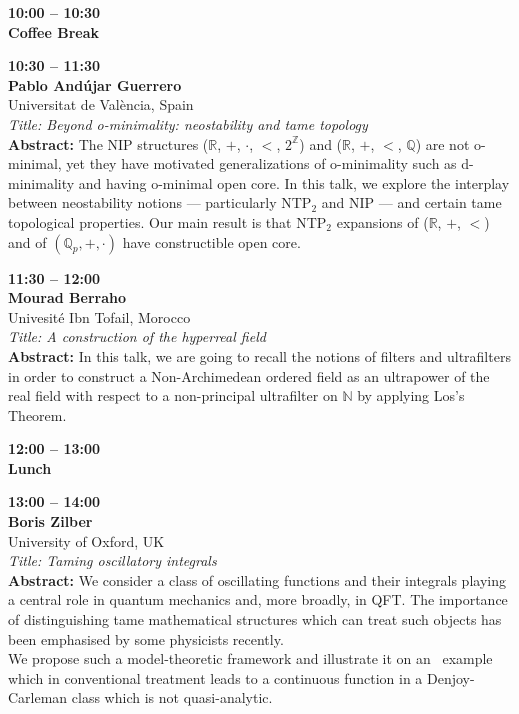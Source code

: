 \documentclass[10pt,a4paper]{article}
\begin{document}
\begin{tcolorbox}[talkbox]
\textbf{10:00 -- 10:30} \\
\textbf{Coffee Break}
\end{tcolorbox}

\begin{tcolorbox}[talkbox]
\textbf{10:30 -- 11:30} \\
\textbf{Pablo Andújar Guerrero} \\
Universitat de València, Spain \\
\textit{Title: Beyond o-minimality: neostability and tame topology} \\
\textbf{Abstract:} The NIP structures ($\mathbb{R}$, $+$, $\cdot$, $<$, $2^\mathbb{Z}$) and ($\mathbb{R}$, $+$, $<$, $\mathbb{Q}$) are not o-minimal, yet they have motivated generalizations of o-minimality such as d-minimality and having o-minimal open core. In this talk, we explore the interplay between neostability notions --- particularly NTP$_2$ and NIP --- and certain tame topological properties. Our main result is that NTP$_2$ expansions of ($\mathbb{R}$, $+$, $<$) and of $(\mathbb{Q}_p, +, \cdot)$ have constructible open core.
\end{tcolorbox}

\begin{tcolorbox}[talkbox]
\textbf{11:30 -- 12:00} \\
\textbf{Mourad Berraho} \\
Univesité Ibn Tofail, Morocco \\
\textit{Title: A construction of the hyperreal field} \\
\textbf{Abstract:} In this talk, we are going to recall the notions of filters and ultrafilters in order to construct a Non-Archimedean ordered field as an ultrapower of the real field with respect to a non-principal ultrafilter on $\mathbb{N}$ by applying Los’s Theorem.
\end{tcolorbox}

\begin{tcolorbox}[talkbox]
\textbf{12:00 -- 13:00} \\
\textbf{Lunch}
\end{tcolorbox}

\begin{tcolorbox}[talkbox]
\textbf{13:00 -- 14:00} \\
\textbf{Boris Zilber} \\
University of Oxford, UK \\
\textit{Title: Taming oscillatory integrals} \\
\textbf{Abstract:} We consider a class of oscillating functions and their integrals  playing a central role in quantum mechanics and, more broadly, in QFT. The importance of distinguishing tame mathematical structures which can treat such objects has been emphasised by some physicists recently.\\

We propose such a model-theoretic framework and illustrate it on an  example which in conventional treatment leads to a continuous function in a Denjoy-Carleman class which is not quasi-analytic.  
\end{tcolorbox}
\end{document}
